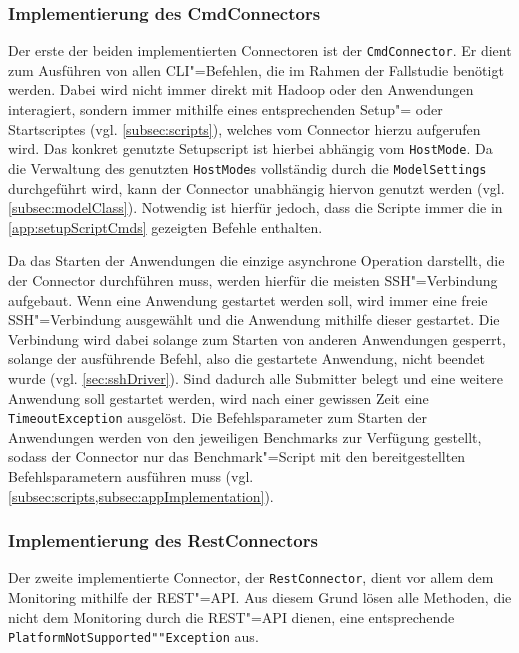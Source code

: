 \subsubsection{Implementierung des CmdConnectors}
\label{subsubsec:implCmdConnector}

Der erste der beiden implementierten Connectoren ist der \texttt{CmdConnector}.
Er dient zum Ausführen von allen CLI"=Befehlen, die im Rahmen der Fallstudie benötigt werden.
Dabei wird nicht immer direkt mit Hadoop oder den Anwendungen interagiert, sondern immer mithilfe eines entsprechenden Setup"= oder Startscriptes (vgl. \cref{subsec:scripts}), welches vom Connector hierzu aufgerufen wird.
Das konkret genutzte Setupscript ist hierbei abhängig vom \texttt{HostMode}.
Da die Verwaltung des genutzten \texttt{HostMode}s vollständig durch die \texttt{ModelSettings} durchgeführt wird, kann der Connector unabhängig hiervon genutzt werden (vgl. \cref{subsec:modelClass}).
Notwendig ist hierfür jedoch, dass die Scripte immer die in \cref{app:setupScriptCmds} gezeigten Befehle enthalten.

Da das Starten der Anwendungen die einzige asynchrone Operation darstellt, die der Connector durchführen muss, werden hierfür die meisten SSH"=Verbindung aufgebaut.
Wenn eine Anwendung gestartet werden soll, wird immer eine freie SSH"=Verbindung ausgewählt und die Anwendung mithilfe dieser gestartet.
Die Verbindung wird dabei solange zum Starten von anderen Anwendungen gesperrt, solange der ausführende Befehl, also die gestartete Anwendung, nicht beendet wurde (vgl. \cref{sec:sshDriver}).
Sind dadurch alle Submitter belegt und eine weitere Anwendung soll gestartet werden, wird nach einer gewissen Zeit eine \texttt{TimeoutException} ausgelöst.
Die Befehlsparameter zum Starten der Anwendungen werden von den jeweiligen Benchmarks zur Verfügung gestellt, sodass der Connector nur das Benchmark"=Script mit den bereitgestellten Befehlsparametern ausführen muss (vgl. \cref{subsec:scripts,subsec:appImplementation}).

\subsubsection{Implementierung des RestConnectors}
\label{subsubsec:implRestConnector}

Der zweite implementierte Connector, der \texttt{RestConnector}, dient vor allem dem Monitoring mithilfe der REST"=API.
Aus diesem Grund lösen alle Methoden, die nicht dem Monitoring durch die REST"=API dienen, eine entsprechende \texttt{PlatformNotSupported""Exception} aus.

